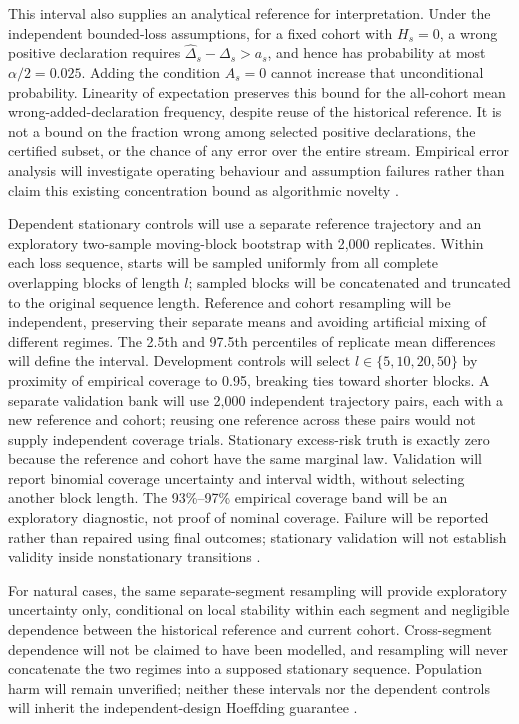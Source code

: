 This interval also supplies an analytical reference for interpretation. Under the independent bounded-loss assumptions, for a fixed cohort with $H_s=0$, a wrong positive declaration requires $\widehat\Delta_s-\Delta_s>a_s$, and hence has probability at most $\alpha/2=0.025$. Adding the condition $A_s=0$ cannot increase that unconditional probability. Linearity of expectation preserves this bound for the all-cohort mean wrong-added-declaration frequency, despite reuse of the historical reference. It is not a bound on the fraction wrong among selected positive declarations, the certified subset, or the chance of any error over the entire stream. Empirical error analysis will investigate operating behaviour and assumption failures rather than claim this existing concentration bound as algorithmic novelty \cite{hoeffding}.

Dependent stationary controls will use a separate reference trajectory and an exploratory two-sample moving-block bootstrap with 2,000 replicates. Within each loss sequence, starts will be sampled uniformly from all complete overlapping blocks of length $l$; sampled blocks will be concatenated and truncated to the original sequence length. Reference and cohort resampling will be independent, preserving their separate means and avoiding artificial mixing of different regimes. The 2.5th and 97.5th percentiles of replicate mean differences will define the interval. Development controls will select $l\in\{5,10,20,50\}$ by proximity of empirical coverage to 0.95, breaking ties toward shorter blocks. A separate validation bank will use 2,000 independent trajectory pairs, each with a new reference and cohort; reusing one reference across these pairs would not supply independent coverage trials. Stationary excess-risk truth is exactly zero because the reference and cohort have the same marginal law. Validation will report binomial coverage uncertainty and interval width, without selecting another block length. The 93\%--97\% empirical coverage band will be an exploratory diagnostic, not proof of nominal coverage. Failure will be reported rather than repaired using final outcomes; stationary validation will not establish validity inside nonstationary transitions \cite{kunsch}.

For natural cases, the same separate-segment resampling will provide exploratory uncertainty only, conditional on local stability within each segment and negligible dependence between the historical reference and current cohort. Cross-segment dependence will not be claimed to have been modelled, and resampling will never concatenate the two regimes into a supposed stationary sequence. Population harm will remain unverified; neither these intervals nor the dependent controls will inherit the independent-design Hoeffding guarantee \cite{kunsch,souza}.

